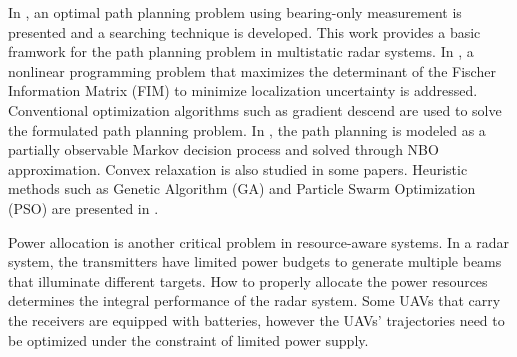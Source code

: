 \documentclass[12pt,journal,draftclsnofoot,onecolumn]{IEEEtran}
\begin{document}
In \cite{hernandez2004optimal}, an optimal path planning problem using bearing-only measurement is presented and a searching technique is developed. This work provides a basic framwork for the path planning problem in multistatic radar systems. In \cite{dogancay2012uav}, a nonlinear programming problem that maximizes the determinant of the Fischer Information Matrix (FIM) to minimize localization uncertainty is addressed. Conventional optimization algorithms such as gradient descend are used to solve the formulated path planning problem\cite{bruna2017airborne}.%
 In \cite{ragi2013uav}, the path planning is modeled as a partially observable Markov decision process and solved through NBO %
 approximation. Convex relaxation is also studied in some papers\cite{xie2017joint}\cite{yan2016joint}. Heuristic methods such as Genetic Algorithm (GA) and Particle Swarm Optimization (PSO) are presented in \cite{roberge2012comparison}.%

Power allocation is another critical problem in resource-aware systems. In a radar system, the transmitters have limited power budgets to generate multiple beams that illuminate different targets. How to properly allocate the power resources determines the integral performance of the radar system. Some UAVs that carry the receivers are equipped with batteries, however the UAVs' trajectories need to be optimized under the constraint of limited power supply.%
\end{document}
